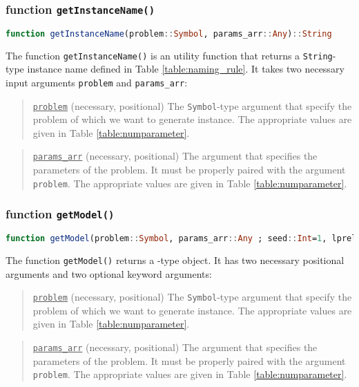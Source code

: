 \subsubsection{function \texttt{getInstanceName()}}
\begin{lstlisting}[frame=single,language=julia]
function getInstanceName(problem::Symbol, params_arr::Any)::String
\end{lstlisting}		
The function \texttt{getInstanceName()} is an utility function that returns a \texttt{String}-type instance name defined in Table \ref{table:naming_rule}. It takes two necessary input arguments \texttt{problem} and \texttt{params\_arr}:
\begin{quote}
	\noindent\underline{\texttt{problem}} (necessary, positional) The \texttt{Symbol}-type argument that specify the problem of which we want to generate instance. The appropriate values are given in Table \ref{table:numparameter}. 
\end{quote}

\begin{quote}
	\noindent\underline{\texttt{params\_arr}} (necessary, positional) The argument that specifies the parameters of the problem. It must be properly paired with the argument \texttt{problem}. The appropriate values are given in Table \ref{table:numparameter}. 
\end{quote}

\subsubsection{function \texttt{getModel()}} 
\begin{lstlisting}[frame=single,language=julia]
function getModel(problem::Symbol, params_arr::Any ; seed::Int=1, lprelax::Int=0)::JuMP.Model
\end{lstlisting}

The function \texttt{getModel()} returns a \jumpmodel-type object. It has two necessary positional arguments and two optional keyword arguments:
\begin{quote}
	\noindent\underline{\texttt{problem}} (necessary, positional) The \texttt{Symbol}-type argument that specify the problem of which we want to generate instance. The appropriate values are given in Table \ref{table:numparameter}. 
\end{quote}

\begin{quote}
	\noindent\underline{\texttt{params\_arr}} (necessary, positional) The argument that specifies the parameters of the problem. It must be properly paired with the argument \texttt{problem}. The appropriate values are given in Table \ref{table:numparameter}. 
\end{quote}

